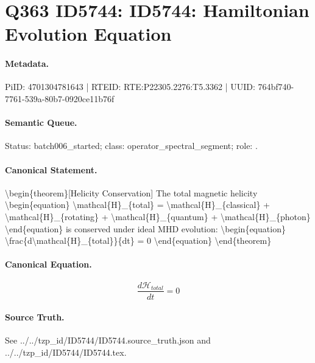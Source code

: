 \section*{Q363 ID5744: ID5744: Hamiltonian Evolution Equation}
\paragraph{Metadata.}
PiID: 4701304781643 | RTEID: RTE:P22305.2276:T5.3362 | UUID: 764bf740-7761-539a-80b7-0920ce11b76f

\paragraph{Semantic Queue.}
Status: batch006\_started; class: operator\_spectral\_segment; role: .

\paragraph{Canonical Statement.}
\textbackslash{}begin\{theorem\}[Helicity Conservation] The total magnetic helicity \textbackslash{}begin\{equation\} \textbackslash{}mathcal\{H\}\_\{total\} = \textbackslash{}mathcal\{H\}\_\{classical\} + \textbackslash{}mathcal\{H\}\_\{rotating\} + \textbackslash{}mathcal\{H\}\_\{quantum\} + \textbackslash{}mathcal\{H\}\_\{photon\} \textbackslash{}end\{equation\} is conserved under ideal MHD evolution: \textbackslash{}begin\{equation\} \textbackslash{}frac\{d\textbackslash{}mathcal\{H\}\_\{total\}\}\{dt\} = 0 \textbackslash{}end\{equation\} \textbackslash{}end\{theorem\}

\paragraph{Canonical Equation.}
\[
\begin{equation} \frac{d\mathcal{H}_{total}}{dt} = 0 \end{equation}
\]

\paragraph{Source Truth.}
See ../../tzp\_id/ID5744/ID5744.source\_truth.json and ../../tzp\_id/ID5744/ID5744.tex.
